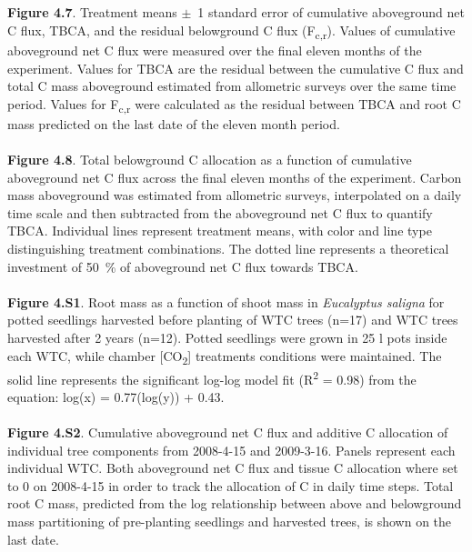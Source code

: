 \documentclass[a4paper]{article}\usepackage[]{graphicx}\usepackage[]{color}
\begin{document}
\\
\\
\textbf{Figure 4.7}. Treatment means $\pm$~1 standard error of cumulative aboveground net C flux, TBCA, and the residual belowground C flux (F\textsubscript{c,r}). Values of cumulative aboveground net C flux were measured over the final eleven months of the experiment. Values for TBCA are the residual between the cumulative C flux and total C mass aboveground estimated from allometric surveys over the same time period. Values for F\textsubscript{c,r} were calculated as the residual between TBCA and root C mass predicted on the last date of the eleven month period. 
\\
\\
\textbf{Figure 4.8}. Total belowground C allocation as a function of cumulative aboveground net C flux across the final eleven months of the experiment. Carbon mass aboveground was estimated from allometric surveys, interpolated on a daily time scale and then subtracted from the aboveground net C flux to quantify TBCA. Individual lines represent treatment means, with color and line type distinguishing treatment combinations. The dotted line represents a theoretical investment of 50~\% of aboveground net C flux towards TBCA.
\\
\\
\textbf{Figure 4.S1}.
Root mass as a function of shoot mass in \textit{Eucalyptus saligna} for potted seedlings harvested before planting of WTC trees (n=17) and WTC trees harvested after 2 years (n=12). Potted seedlings were grown in 25 l pots inside each WTC, while chamber [CO\textsubscript{2}] treatments conditions were maintained. The solid line represents the significant log-log model fit (R\textsuperscript{2} = 0.98) from the equation: log(x) = 0.77(log(y)) + 0.43.
\\
\\
\textbf{Figure 4.S2}.
Cumulative aboveground net C flux and additive C allocation of individual tree components from 2008-4-15 and 2009-3-16. Panels represent each individual WTC. Both aboveground net C flux and tissue C allocation where set to 0 on 2008-4-15 in order to track the allocation of C in daily time steps. Total root C mass, predicted from the log relationship between above and belowground mass partitioning of pre-planting seedlings and harvested trees, is shown on the last date.

\clearpage
\end{document}
